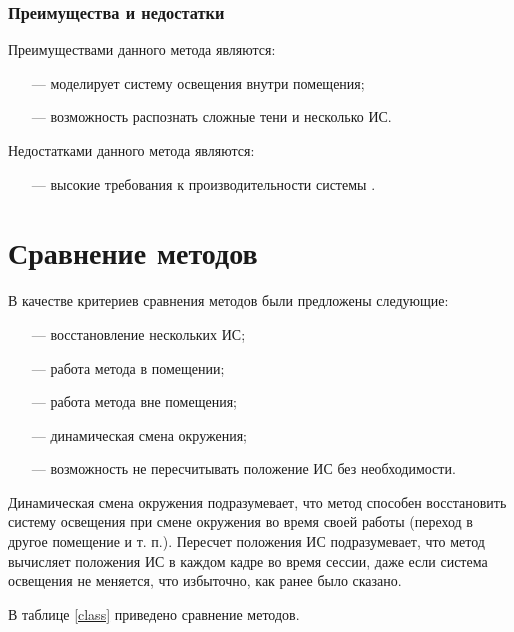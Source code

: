 \subsubsection*{Преимущества и недостатки}

Преимуществами данного метода являются:

\begin{itemize}
	\item[---] моделирует систему освещения внутри помещения;
	\item[---] возможность распознать сложные тени и несколько ИС.
\end{itemize}

Недостатками данного метода являются:

\begin{itemize}
	\item[---] высокие требования к производительности системы \cite{tras}.
\end{itemize}

\section{Сравнение методов}

В качестве критериев сравнения методов были предложены следующие:

\begin{itemize}
	\item[---] восстановление нескольких ИС;
	\item[---] работа метода в помещении;
	\item[---] работа метода вне помещения;
	\item[---] динамическая смена окружения;
	\item[---] возможность не пересчитывать положение ИС без необходимости.
\end{itemize}

Динамическая смена окружения подразумевает, что метод способен восстановить систему освещения при смене окружения во время своей работы (переход в другое помещение и т. п.). Пересчет положения ИС подразумевает, что метод вычисляет положения ИС в каждом кадре во время сессии, даже если система освещения не меняется, что избыточно, как ранее было сказано.

В таблице \ref{class} приведено сравнение методов.

